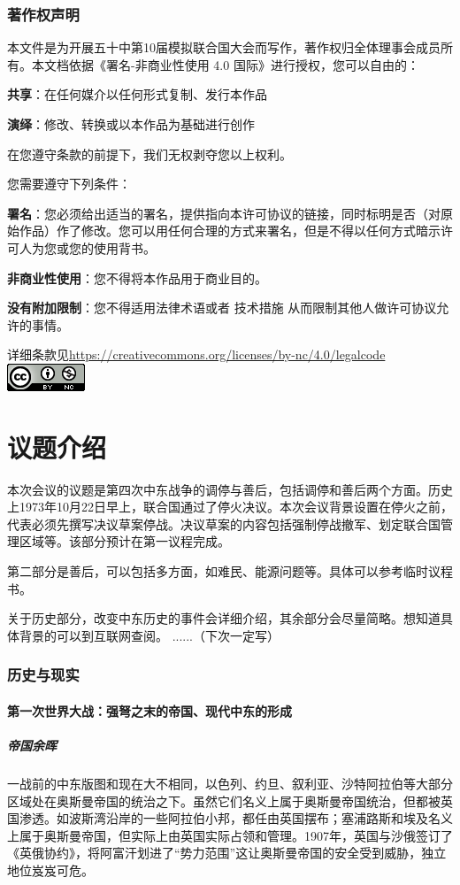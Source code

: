 \documentclass{article}
\begin{document}
\section{著作权声明}
本文件是为开展五十中第10届模拟联合国大会而写作，著作权归全体理事会成员所有。本文档依据《署名-非商业性使用 4.0 国际》进行授权，您可以自由的：

\large{\textbf{共享}：在任何媒介以任何形式复制、发行本作品}

\large{\textbf{演绎}：修改、转换或以本作品为基础进行创作}

在您遵守条款的前提下，我们无权剥夺您以上权利。

您需要遵守下列条件：

\large{\textbf{署名}：您必须给出适当的署名，提供指向本许可协议的链接，同时标明是否（对原始作品）作了修改。您可以用任何合理的方式来署名，但是不得以任何方式暗示许可人为您或您的使用背书。}

\large{\textbf{非商业性使用}：您不得将本作品用于商业目的。}

\large{\textbf{没有附加限制}：您不得适用法律术语或者 技术措施 从而限制其他人做许可协议允许的事情。}

详细条款见\url{https://creativecommons.org/licenses/by-nc/4.0/legalcode}
\\
\includegraphics{88x31.png}
\clearpage
\part{议题介绍}
本次会议的议题是第四次中东战争的调停与善后，包括调停和善后两个方面。历史上1973年10月22日早上，联合国通过了停火决议。本次会议背景设置在停火之前，代表必须先撰写决议草案停战。决议草案的内容包括强制停战撤军、划定联合国管理区域等。该部分预计在第一议程完成。

第二部分是善后，可以包括多方面，如难民、能源问题等。具体可以参考临时议程书。

关于历史部分，改变中东历史的事件会详细介绍，其余部分会尽量简略。想知道具体背景的可以到互联网查阅。
......（下次一定写）
\section{历史与现实}
\subsection{第一次世界大战：强弩之末的帝国、现代中东的形成}
\subsubsection{帝国余晖}
一战前的中东版图和现在大不相同，以色列、约旦、叙利亚、沙特阿拉伯等大部分区域处在奥斯曼帝国的统治之下。虽然它们名义上属于奥斯曼帝国统治，但都被英国渗透。如波斯湾沿岸的一些阿拉伯小邦，都任由英国摆布；塞浦路斯和埃及名义上属于奥斯曼帝国，但实际上由英国实际占领和管理。1907年，英国与沙俄签订了《英俄协约》，将阿富汗划进了“势力范围”这让奥斯曼帝国的安全受到威胁，独立地位岌岌可危。
\end{document}
